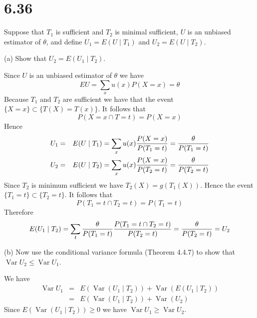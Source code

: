 \section*{6.36}
Suppose that $T_1$ is sufficient and $T_2$ is minimal sufficient,
$U$ is an unbiased estimator of $\theta$, and define
$U_1=E(U\mid T_1)$ and $U_2=E(U\mid T_2)$.

\bigskip
\noindent
(a) Show that $U_2=E(U_1\mid T_2)$.

\bigskip
\noindent
Since $U$ is an unbiased estimator of $\theta$ we have
$$EU=\sum_x u(x)P(X=x)=\theta$$
Because $T_1$ and $T_2$ are sufficient we have that the event
$\{X=x\}\subset\{T(X)=T(x)\}$.
It follows that
$$P(X=x\cap T=t)=P(X=x)$$
Hence
\begin{eqnarray*}
U_1&=&E(U\mid T_1)=\sum_x u(x){P(X=x)\over P(T_1=t)}={\theta\over P(T_1=t)}\\
U_2&=&E(U\mid T_2)=\sum_x u(x){P(X=x)\over P(T_2=t)}={\theta\over P(T_2=t)}
\end{eqnarray*}
Since $T_2$ is minimum sufficient we have $T_2(X)=g(T_1(X))$.
Hence the event $\{T_1=t\}\subset\{T_2=t\}$.
It follows that
$$P(T_1=t\cap T_2=t)=P(T_1=t)$$
Therefore
$$E(U_1\mid T_2)=\sum_t {\theta\over P(T_1=t)}
{P(T_1=t\cap T_2=t)\over P(T_2=t)}={\theta\over P(T_2=t)}=U_2
$$

\bigskip
\noindent
(b) Now use the conditional variance formula (Theorem 4.4.7)
to show that $\mathop{Var}U_2\le\mathop{Var}U_1$.

\bigskip
\noindent
We have
\begin{eqnarray*}
\mathop{Var}U_1&=&E(\mathop{Var}(U_1\mid T_2))+\mathop{Var}(E(U_1\mid T_2))\\
&=&E(\mathop{Var}(U_1\mid T_2))+\mathop{Var}(U_2)
\end{eqnarray*}
Since $E(\mathop{Var}(U_1\mid T_2))\ge0$ we have
$\mathop{Var}U_1\ge\mathop{Var}U_2$.

